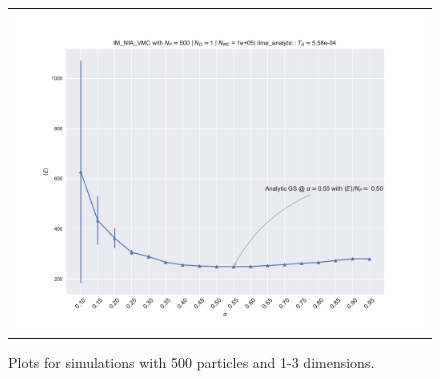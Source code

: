 \begin{figure}
\begin{tabular}{cc}
\multicolumn{2}{c}{\includegraphics[width=0.5\paperwidth]{figures/c_figs/IM_NIA_np_500_nd_1.pdf} }
\end{tabular}
\caption{Plots for simulations with 500 particles and 1-3 dimensions.}
\label{fig:1c_500}
\end{figure}

